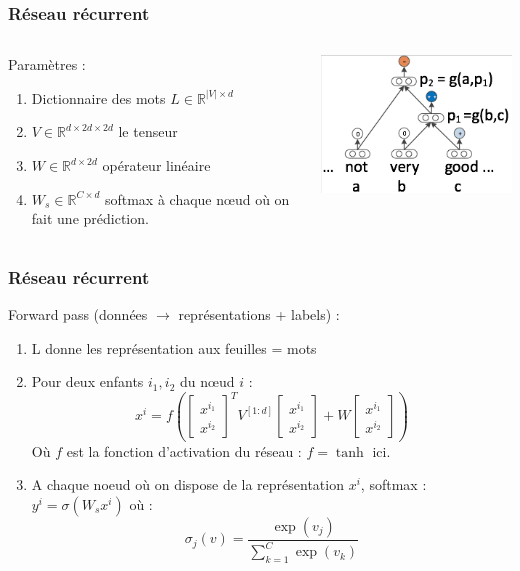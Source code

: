 \documentclass{beamer}
\begin{document}
\begin{frame}
\frametitle{Réseau récurrent}
\begin{columns}
\begin{column}{0.45\textwidth}
Paramètres :
\begin{enumerate}
\item Dictionnaire des mots $L\in\mathbb{R}^{|V|\times d}$ 
\item $V\in\mathbb{R}^{d\times 2d\times 2d}$ le tenseur
\item $W\in\mathbb{R}^{d\times 2d}$ opérateur linéaire 
\item $W_s\in\mathbb{R}^{C\times d}$ softmax à chaque nœud où on fait une prédiction.
\end{enumerate}
\end{column}
\begin{column}{0.45\textwidth}
\includegraphics[width=\textwidth]{fig/RNN.png}
\end{column}
\end{columns}
\end{frame}

\begin{frame}
\frametitle{Réseau récurrent}
Forward pass (données $\rightarrow$ représentations + labels) :
\begin{enumerate}
\item L donne les représentation aux feuilles = mots
\item Pour deux enfants $i_1,i_2$ du nœud $i$ :
$$x^i=f\left(\begin{bmatrix} x^{i_1} \\ x^{i_2} \end{bmatrix}^T V^{[1:d]}\begin{bmatrix} x^{i_1} \\ x^{i_2} \end{bmatrix} + W\begin{bmatrix} x^{i_1} \\ x^{i_2} \end{bmatrix}\right)$$
Où $f$ est la fonction d'activation du réseau : $f=\tanh$ ici.
\item A chaque noeud où on dispose de la représentation $x^i$, softmax : $y^i=\sigma(W_s x^i)$ où :
$$\sigma_j(v)=\frac{\exp(v_j)}{\sum_{k=1}^C \exp(v_k)}$$
\end{enumerate}
\end{frame}
\end{document}

